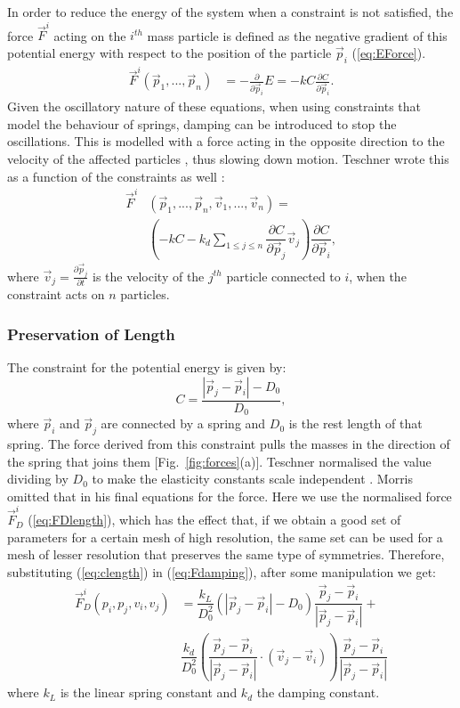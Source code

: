 \documentclass[journal]{IEEEtran}
\newcommand{\eref}[1]{(\ref{#1})}
\newcommand{\fref}[1]{Fig.~\ref{#1}}
\newcommand{\comment}[1]{{\color{red} #1}}
\begin{document}
In order to reduce the energy of the system when a constraint is not satisfied, the force $\vec{F}^i$ acting on the $i^{th}$ mass particle is defined as the negative gradient of this potential energy with respect to the position of the particle $\vec{p}_i$ \eref{eq:EForce}.
\begin{align}
 \vec{F}^i(\vec{p}_1,...,\vec{p}_{n}) & = -\frac{\partial}{\partial \vec{p}_i}E = -kC\frac{\partial C}{\partial \vec{p}_i}. \label{eq:EForce}
\end{align}
Given the oscillatory nature of these equations, \comment{when using constraints that model the behaviour of springs,} damping can be introduced to stop the oscillations.  This is modelled with a force acting in the opposite direction to the velocity of the affected particles\comment{, thus slowing down motion.  Teschner wrote this as a function of the constraints as well \cite{Teschner2004}}:
\begin{align}
 \label{eq:Fdamping}
 \vec{F}^i&(\vec{p}_1,...,\vec{p}_{n},\vec{v}_1,...,\vec{v}_{n}) = \nonumber \\
    &\left( -kC-k_d\sum_{1 \le j \le n} \dfrac{\partial C}{\partial \vec{p}_j}\vec{v}_j \right)
 \dfrac{\partial C}{\partial \vec{p}_i},
\end{align}
where $\vec{v}_j = \frac{\partial \vec{p}_j}{\partial t}$ is the velocity of the $j^{th}$ particle connected to $i$, when the constraint acts on $n$ particles.

\subsubsection{Preservation of Length}
The constraint for the potential energy is given by:
\begin{equation}
 C = \dfrac{|\vec{p}_j-\vec{p}_i|-D_0}{D_0}, \label{eq:clength}
\end{equation}
where $\vec{p}_i$ and $\vec{p}_j$ are connected by a spring and $D_0$ is the rest length of that spring.  The force derived from this constraint pulls the masses in the direction of the spring that joins them [\fref{fig:forces}(a)].  Teschner normalised the value dividing by $D_0$ to make the elasticity constants scale independent \cite{Teschner2004}.  Morris \cite{Morris2008} omitted that in his final equations for the force.  Here we use the normalised force $\vec{F}^i_D$ \eref{eq:FDlength}, which has the effect that, if we obtain a good set of parameters for a certain mesh of high resolution, the same set can be used for a mesh of lesser resolution that preserves the same type of symmetries.  Therefore, substituting \eref{eq:clength} in \eref{eq:Fdamping}, after some manipulation we get:
\begin{align}
 \vec{F}^i_D(p_i,p_j,v_i,v_j) &= \dfrac{k_L}{D_0^2} \left( |\vec{p}_j-\vec{p}_i|-D_0 \right) \dfrac{\vec{p}_j-\vec{p}_i}{|\vec{p}_j-\vec{p}_i|}  + \nonumber \\
 & \dfrac{k_d}{D_0^2}\left( \dfrac{\vec{p}_j-\vec{p}_i}{|\vec{p}_j-\vec{p}_i|} \cdot (\vec{v}_j-\vec{v}_i) \right) \dfrac{\vec{p}_j-\vec{p}_i}{|\vec{p}_j-\vec{p}_i|} \label{eq:FDlength}
\end{align}
where $k_L$ is the linear spring constant and $k_d$ the damping constant.
\end{document}
